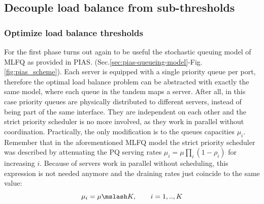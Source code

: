 \subsection{Decouple load balance from sub-thresholds}
\label{sec:decoupling}
\subsubsection{Optimize load balance thresholds}
\label{sec:optimal-lb-problem}
For the first phase turns out again to be useful the stochastic queuing model of MLFQ as provided in PIAS. (Sec.\ref{sec:pias-queueing-model}-Fig.\ref{fig:pias_scheme}). Each server is equipped with a single priority queue per port, therefore the optimal load balance problem can be abstracted with exactly the same model, where each queue in the tandem maps a server. After all, in this case priority queues are physically distributed to different servers, instead of being part of the same interface. They are independent on each other and the strict priority scheduler is no more involved, as they work in parallel without coordination. Practically, the only modification is to the queues capacities $\mu_i$. Remember that in the aforementioned MLFQ model the strict priority scheduler was described by attenuating the PQ serving rates $\mu_i = \mu\prod_{i}(1-\rho_i)$ for increasing $i$. Because of servers work in parallel without scheduling, this expression is not needed anymore and the draining rates just coincide to the same value:
\[
\mu_i = \mu \mslash K, \qquad i=1,..,K
\]

